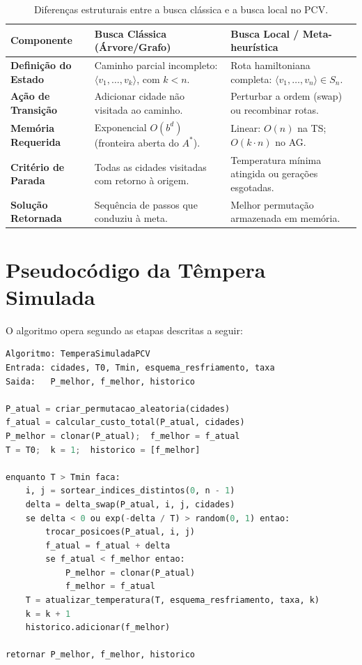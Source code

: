 \documentclass[11pt]{article}
\begin{document}
\begin{table}[H]
\centering
\caption{Diferenças estruturais entre a busca clássica e a busca local no PCV.}
\label{tab:busca-classica-vs-local}
\begin{tabular}{p{3.5cm}p{5.5cm}p{5.5cm}}
\toprule
\textbf{Componente} & \textbf{Busca Clássica (Árvore/Grafo)} & \textbf{Busca Local / Meta-heurística} \\
\midrule
\textbf{Definição do Estado} & Caminho parcial incompleto: $\langle v_1, \dots, v_k \rangle$, com $k < n$. & Rota hamiltoniana completa: $\langle v_1, \dots, v_n \rangle \in S_n$. \\
\textbf{Ação de Transição} & Adicionar cidade não visitada ao caminho. & Perturbar a ordem (swap) ou recombinar rotas. \\
\textbf{Memória Requerida} & Exponencial $O(b^d)$ (fronteira aberta do $A^*$). & Linear: $O(n)$ na TS; $O(k \cdot n)$ no AG. \\
\textbf{Critério de Parada} & Todas as cidades visitadas com retorno à origem. & Temperatura mínima atingida ou gerações esgotadas. \\
\textbf{Solução Retornada} & Sequência de passos que conduziu à meta. & Melhor permutação armazenada em memória. \\
\bottomrule
\end{tabular}
\end{table}

\section{Pseudocódigo da Têmpera Simulada} \label{ap:alg-ts}

O algoritmo opera segundo as etapas descritas a seguir:

\begin{lstlisting}[language=Python, caption={Algoritmo da Têmpera Simulada para o PCV.}]
Algoritmo: TemperaSimuladaPCV
Entrada: cidades, T0, Tmin, esquema_resfriamento, taxa
Saida:   P_melhor, f_melhor, historico

P_atual = criar_permutacao_aleatoria(cidades)
f_atual = calcular_custo_total(P_atual, cidades)
P_melhor = clonar(P_atual);  f_melhor = f_atual
T = T0;  k = 1;  historico = [f_melhor]

enquanto T > Tmin faca:
    i, j = sortear_indices_distintos(0, n - 1)
    delta = delta_swap(P_atual, i, j, cidades)
    se delta < 0 ou exp(-delta / T) > random(0, 1) entao:
        trocar_posicoes(P_atual, i, j)
        f_atual = f_atual + delta
        se f_atual < f_melhor entao:
            P_melhor = clonar(P_atual)
            f_melhor = f_atual
    T = atualizar_temperatura(T, esquema_resfriamento, taxa, k)
    k = k + 1
    historico.adicionar(f_melhor)

retornar P_melhor, f_melhor, historico
\end{lstlisting}
\end{document}
